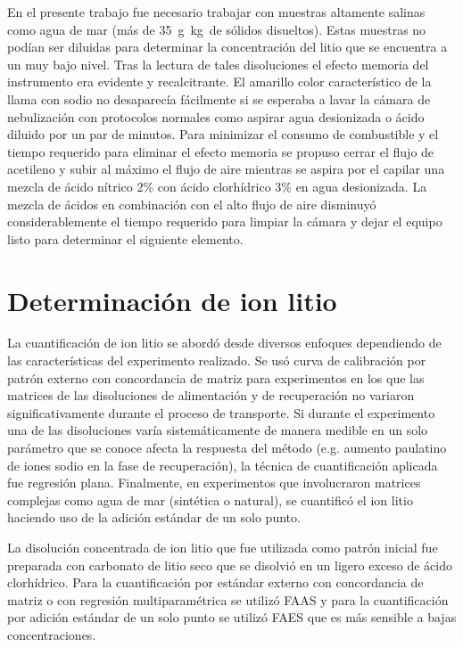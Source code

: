 \vspace{-0.7cm}En el presente trabajo fue necesario trabajar con muestras altamente salinas como agua de mar (más de 35~g~kg\mnn\ de sólidos disueltos). Estas muestras no podían ser diluidas para determinar la concentración del litio que se encuentra a un muy bajo nivel. Tras la lectura de tales disoluciones el efecto memoria del instrumento era evidente y recalcitrante. El amarillo color característico de la llama con sodio no desaparecía fácilmente si se esperaba a lavar la cámara de nebulización con protocolos normales como aspirar agua desionizada o ácido diluido por un par de minutos. Para minimizar el consumo de combustible y el tiempo requerido para eliminar el efecto memoria se propuso cerrar el flujo de acetileno y subir al máximo el flujo de aire mientras se aspira por el capilar una mezcla de ácido nítrico 2\% con ácido clorhídrico 3\% en agua desionizada. La mezcla de ácidos en combinación con el alto flujo de aire disminuyó considerablemente el tiempo requerido para limpiar la cámara y dejar el equipo listo para determinar el siguiente elemento.


\section{Determinación de ion litio}
La cuantificación de ion litio se abordó desde diversos enfoques dependiendo de las características del experimento realizado. Se usó curva de calibración por patrón externo con concordancia de matriz para experimentos en los que las matrices de las disoluciones de alimentación y de recuperación no variaron significativamente durante el proceso de transporte. Si durante el experimento una de las disoluciones varía sistemáticamente de manera medible en un solo parámetro que se conoce afecta la respuesta del método (e.g. aumento paulatino de iones sodio en la fase de recuperación), la técnica de cuantificación aplicada fue regresión plana. Finalmente, en experimentos que involucraron matrices complejas como agua de mar (sintética o natural), se cuantificó el ion litio haciendo uso de la adición estándar de un solo punto.

La disolución concentrada de ion litio que fue utilizada como patrón inicial fue preparada con carbonato de litio seco que se disolvió en un ligero exceso de ácido clorhídrico. Para la cuantificación por estándar externo con concordancia de matriz o con regresión multiparamétrica se utilizó \ac{FAAS} y para la cuantificación por adición estándar de un solo punto se utilizó \ac{FAES} que es más sensible a bajas concentraciones.

